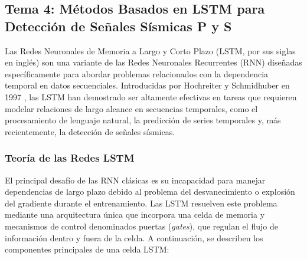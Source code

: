 \subsection{Tema 4: Métodos Basados en LSTM para Detección de Señales Sísmicas P y S}

Las Redes Neuronales de Memoria a Largo y Corto Plazo (LSTM, por sus siglas en inglés) son una variante de las Redes Neuronales Recurrentes (RNN) diseñadas específicamente para abordar problemas relacionados con la dependencia temporal en datos secuenciales. Introducidas por Hochreiter y Schmidhuber en 1997 \cite{hochreiter1997long}, las LSTM han demostrado ser altamente efectivas en tareas que requieren modelar relaciones de largo alcance en secuencias temporales, como el procesamiento de lenguaje natural, la predicción de series temporales y, más recientemente, la detección de señales sísmicas.

\subsubsection{Teoría de las Redes LSTM}

El principal desafío de las RNN clásicas es su incapacidad para manejar dependencias de largo plazo debido al problema del desvanecimiento o explosión del gradiente durante el entrenamiento. Las LSTM resuelven este problema mediante una arquitectura única que incorpora una celda de memoria y mecanismos de control denominados puertas (\textit{gates}), que regulan el flujo de información dentro y fuera de la celda. A continuación, se describen los componentes principales de una celda LSTM:

